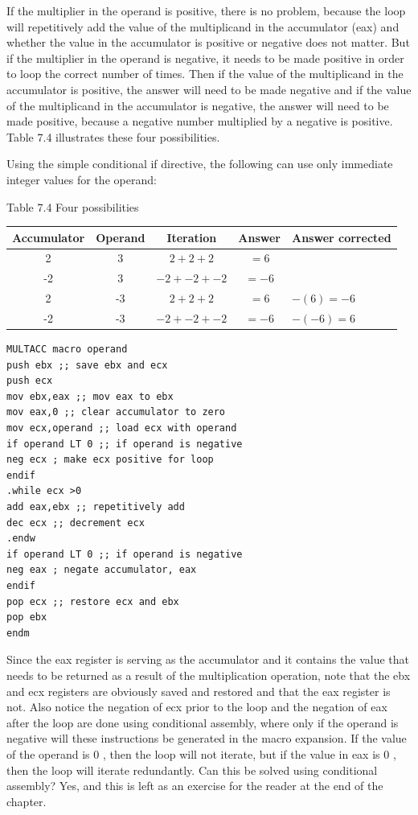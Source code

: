 \documentclass[10pt]{book}
\begin{document}
If the multiplier in the operand is positive, there is no problem, because the loop will repetitively add the value of the multiplicand in the accumulator (eax) and whether the value in the accumulator is positive or negative does not matter. But if the multiplier in the operand is negative, it needs to be made positive in order to loop the correct number of times. Then if the value of the multiplicand in the accumulator is positive, the answer will need to be made negative and if the value of the multiplicand in the accumulator is negative, the answer will need to be made positive, because a negative number multiplied by a negative is positive. Table 7.4 illustrates these four possibilities.

Using the simple conditional if directive, the following can use only immediate integer values for the operand:

Table 7.4 Four possibilities

\begin{center}
\begin{tabular}{|ccccl|}
\hline
Accumulator & Operand & Iteration & Answer & Answer corrected \\
\hline
2 & 3 & $2+2+2$ & $=6$ &  \\
\hline
-2 & 3 & $-2+-2+-2$ & $=-6$ &  \\
2 & -3 & $2+2+2$ & $=6$ & $-(6)=-6$ \\
-2 & -3 & $-2+-2+-2$ & $=-6$ & $-(-6)=6$ \\
\hline
\end{tabular}
\end{center}

\begin{verbatim}
MULTACC macro operand
push ebx ;; save ebx and ecx
push ecx
mov ebx,eax ;; mov eax to ebx
mov eax,0 ;; clear accumulator to zero
mov ecx,operand ;; load ecx with operand
if operand LT 0 ;; if operand is negative
neg ecx ; make ecx positive for loop
endif
.while ecx >0
add eax,ebx ;; repetitively add
dec ecx ;; decrement ecx
.endw
if operand LT 0 ;; if operand is negative
neg eax ; negate accumulator, eax
endif
pop ecx ;; restore ecx and ebx
pop ebx
endm
\end{verbatim}

Since the eax register is serving as the accumulator and it contains the value that needs to be returned as a result of the multiplication operation, note that the ebx and ecx registers are obviously saved and restored and that the eax register is not. Also notice the negation of ecx prior to the loop and the negation of eax after the loop are done using conditional assembly, where only if the operand is negative will these instructions be generated in the macro expansion. If the value of the operand is 0 , then the loop will not iterate, but if the value in eax is 0 , then the loop will iterate redundantly. Can this be solved using conditional assembly? Yes, and this is left as an exercise for the reader at the end of the chapter.
\end{document}
